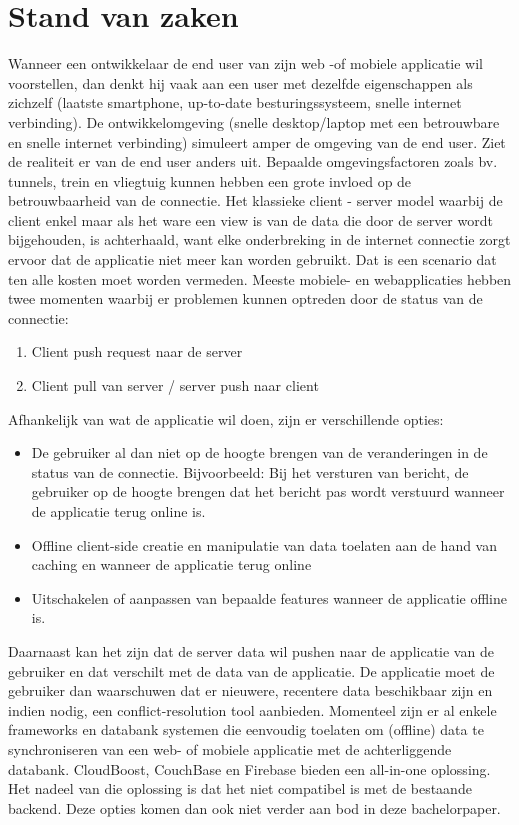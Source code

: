 \section{Stand van zaken}
\label{sec:stand-van-zaken}
Wanneer een ontwikkelaar de end user van zijn web -of mobiele applicatie wil voorstellen, dan denkt hij vaak aan een user met dezelfde eigenschappen als zichzelf (laatste smartphone, up-to-date besturingssysteem,  snelle internet verbinding). De ontwikkelomgeving (snelle desktop/laptop met een betrouwbare en snelle internet verbinding) simuleert amper de omgeving van de end user. Ziet de realiteit er van de end user anders uit. Bepaalde omgevingsfactoren zoals bv. tunnels, trein en vliegtuig kunnen hebben een grote invloed op de betrouwbaarheid van de connectie. Het klassieke client - server model waarbij de client enkel maar als het ware een view is van de data die door de server wordt bijgehouden, is achterhaald, want elke onderbreking in de internet connectie zorgt ervoor dat de applicatie niet meer kan worden gebruikt. Dat is een scenario dat ten alle kosten moet worden vermeden. Meeste mobiele- en webapplicaties hebben twee momenten waarbij er problemen kunnen optreden door de status van de connectie:
\begin{enumerate}  
\item Client push request naar de server
\item Client pull van server / server push naar client
\end{enumerate}
Afhankelijk van wat de applicatie wil doen, zijn er verschillende opties:
\begin{itemize}  
\item De gebruiker al dan niet op de hoogte brengen van de veranderingen in de status van de connectie. Bijvoorbeeld: Bij het versturen van bericht, de gebruiker op de hoogte brengen dat het bericht pas wordt verstuurd wanneer de applicatie terug online is.
\item Offline client-side creatie en manipulatie van data toelaten aan de hand van caching en wanneer de applicatie terug online 
\item Uitschakelen of aanpassen van bepaalde features wanneer de applicatie offline is.
\end{itemize}
Daarnaast kan het zijn dat de server data wil pushen naar de applicatie van de gebruiker en dat verschilt met de data van de applicatie. De applicatie moet de gebruiker dan waarschuwen dat er nieuwere, recentere data beschikbaar zijn en indien nodig, een conflict-resolution tool aanbieden.
Momenteel zijn er al enkele frameworks en databank systemen die eenvoudig toelaten om (offline) data te synchroniseren van een web- of mobiele applicatie met de achterliggende databank. CloudBoost, CouchBase en Firebase bieden een all-in-one oplossing. Het nadeel van die oplossing is dat het niet compatibel is met de bestaande backend. Deze opties komen dan ook niet verder aan bod in deze bachelorpaper.
